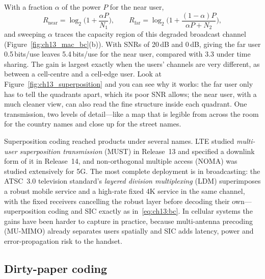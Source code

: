 With a fraction $\alpha$ of the power $P$ for the near user,
\begin{equation}
R_{\text{near}}=\log_2\!\Big(1+\frac{\alpha P}{N_1}\Big),\qquad
R_{\text{far}}=\log_2\!\Big(1+\frac{(1-\alpha)P}{\alpha P+N_2}\Big),
\label{eq:ch13:bc}
\end{equation}
and sweeping $\alpha$ traces the capacity region of this degraded broadcast channel
(Figure~\ref{fig:ch13_mac_bc}(b)). With SNRs of 20\,dB and 0\,dB, giving the far user 0.5\,bits/use
leaves 5.4\,bits/use for the near user, compared with 3.3 under time sharing. The gain is largest
exactly when the users' channels are very different, as between a cell-centre and a cell-edge
user. Look at Figure~\ref{fig:ch13_superposition} and you can see why it works: the far user only
has to tell the quadrants apart, which its poor SNR allows; the near user, with a much cleaner
view, can also read the fine structure inside each quadrant. One transmission, two levels of
detail---like a map that is legible from across the room for the country names and close up for
the street names.

\begin{inpractice}
Superposition coding reached products under several names. LTE studied \emph{multi-user
superposition transmission} (MUST) in Release~13 and specified a downlink form of it in Release~14, and non-orthogonal multiple
access (NOMA) was studied extensively for 5G. The most complete deployment is in broadcasting: the
ATSC~3.0 television standard's \emph{layered division multiplexing} (LDM) superimposes a robust
mobile service and a high-rate fixed 4K service in the same channel, with the fixed receivers
cancelling the robust layer before decoding their own---superposition coding and SIC exactly as
in~\eqref{eq:ch13:bc}. In cellular systems the gains have been harder to capture in practice,
because multi-antenna precoding (MU-MIMO) already separates users spatially and SIC adds latency,
power and error-propagation risk to the handset.
\end{inpractice}

\subsection{Dirty-paper coding}

